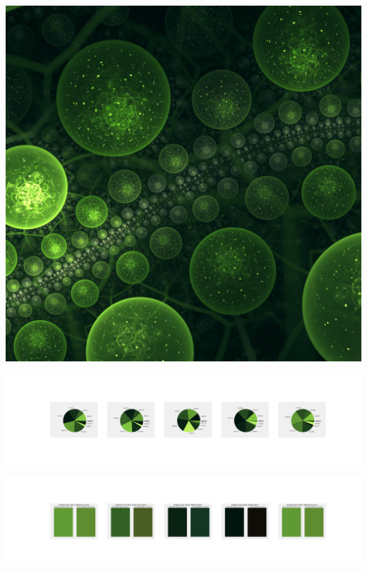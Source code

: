 \documentclass[11pt]{article}
\begin{document}
\begin{landscape}
    \begin{center}
    \includegraphics[width=\textwidth]{./nbimg/file (344).jpg}
    \end{center}

    \begin{center}
    \includegraphics[width=250mm]{./nbimg/pie-272.jpg}
    \end{center}

    \begin{center}
    \includegraphics[width=250mm]{./nbimg/peak-272.jpg}
    \end{center}
    


\end{landscape}
\end{document}
